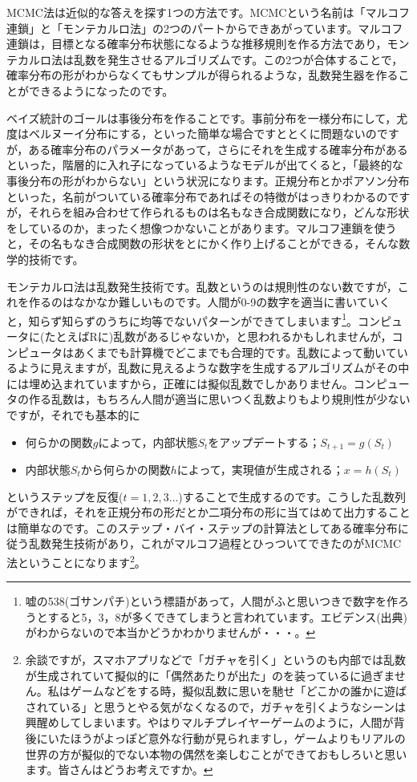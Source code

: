 \documentclass{ltjsbook}
\begin{document}
MCMC法は近似的な答えを探す1つの方法です。MCMCという名前は「マルコフ連鎖」と「モンテカルロ法」の2つのパートからできあがっています。マルコフ連鎖は，目標となる確率分布状態になるような推移規則を作る方法であり，モンテカルロ法は乱数を発生させるアルゴリズムです。この2つが合体することで，確率分布の形がわからなくてもサンプルが得られるような，乱数発生器を作ることができるようになったのです。

ベイズ統計のゴールは事後分布を作ることです。事前分布を一様分布にして，尤度はベルヌーイ分布にする，といった簡単な場合ですととくに問題ないのですが，ある確率分布のパラメータがあって，さらにそれを生成する確率分布があるといった，階層的に入れ子になっているようなモデルが出てくると，「最終的な事後分布の形がわからない」という状況になります。正規分布とかポアソン分布といった，名前がついている確率分布であればその特徴がはっきりわかるのですが，それらを組み合わせて作られるものは名もなき合成関数になり，どんな形状をしているのか，まったく想像つかないことがあります。マルコフ連鎖を使うと，その名もなき合成関数の形状をとにかく作り上げることができる，そんな数学的技術です。

モンテカルロ法は乱数発生技術です。乱数というのは規則性のない数ですが，これを作るのはなかなか難しいものです。人間が0-9の数字を適当に書いていくと，知らず知らずのうちに均等でないパターンができてしまいます\footnote{嘘の538(ゴサンパチ)という標語があって，人間がふと思いつきで数字を作ろうとすると5，3，8が多くできてしまうと言われています。エビデンス(出典)がわからないので本当かどうかわかりませんが・・・。}。コンピュータに(たとえばRに)乱数があるじゃないか，と思われるかもしれませんが，コンピュータはあくまでも計算機でどこまでも合理的です。乱数によって動いているように見えますが，乱数に見えるような数字を生成するアルゴリズムがその中には埋め込まれていますから，正確には擬似乱数でしかありません。コンピュータの作る乱数は，もちろん人間が適当に思いつく乱数よりもより規則性が少ないですが，それでも基本的に
\begin{itemize}
	\item 何らかの関数$g$によって，内部状態$S_t$をアップデートする；$S_{t+1}=g(S_t)$
	\item 内部状態$S_t$から何らかの関数$h$によって，実現値が生成される；$x = h(S_t)$
\end{itemize}
というステップを反復($t=1,2,3\ldots$)することで生成するのです。こうした乱数列ができれば，それを正規分布の形だとか二項分布の形に当てはめて出力することは簡単なのです。このステップ・バイ・ステップの計算法としてある確率分布に従う乱数発生技術があり，これがマルコフ過程とひっついてできたのがMCMC法ということになります\footnote{余談ですが，スマホアプリなどで「ガチャを引く」というのも内部では乱数が生成されていて擬似的に「偶然あたりが出た」のを装っているに過ぎません。私はゲームなどをする時，擬似乱数に思いを馳せ「どこかの誰かに遊ばされている」と思うとやる気がなくなるので，ガチャを引くようなシーンは興醒めしてしまいます。やはりマルチプレイヤーゲームのように，人間が背後にいたほうがよっぽど意外な行動が見られますし，ゲームよりもリアルの世界の方が擬似的でない本物の偶然を楽しむことができておもしろいと思います。皆さんはどうお考えですか。}。
\end{document}
